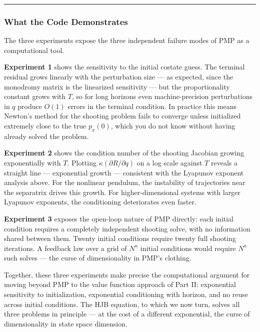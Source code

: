 \documentclass{article}
\begin{document}

\medskip\hrule\medskip

\subsubsection{What the Code Demonstrates}

The three experiments expose the three independent failure modes of PMP as a computational tool.

\textbf{Experiment 1} shows the sensitivity to the initial costate guess. The terminal residual grows linearly with the perturbation size — as expected, since the monodromy matrix is the linearized sensitivity — but the proportionality constant grows with $T$, so for long horizons even machine-precision perturbations in $q$ produce $O(1)$ errors in the terminal condition. In practice this means Newton's method for the shooting problem fails to converge unless initialized extremely close to the true $p_x(0)$, which you do not know without having already solved the problem.

\textbf{Experiment 2} shows the condition number of the shooting Jacobian growing exponentially with $T$. Plotting $\kappa(\partial R / \partial q)$ on a log scale against $T$ reveals a straight line — exponential growth — consistent with the Lyapunov exponent analysis above. For the nonlinear pendulum, the instability of trajectories near the separatrix drives this growth. For higher-dimensional systems with larger Lyapunov exponents, the conditioning deteriorates even faster.

\textbf{Experiment 3} exposes the open-loop nature of PMP directly: each initial condition requires a completely independent shooting solve, with no information shared between them. Twenty initial conditions require twenty full shooting iterations. A feedback law over a grid of $N^n$ initial conditions would require $N^n$ such solves — the curse of dimensionality in PMP's clothing.

Together, these three experiments make precise the computational argument for moving beyond PMP to the value function approach of Part II: exponential sensitivity to initialization, exponential conditioning with horizon, and no reuse across initial conditions. The HJB equation, to which we now turn, solves all three problems in principle — at the cost of a different exponential, the curse of dimensionality in state space dimension.
\end{document}
